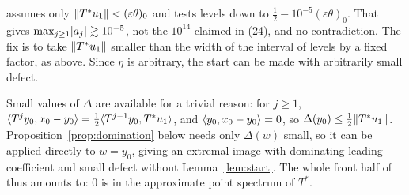 \begin{remark}
\paper{} assumes only $\lVert T^*u_1\rVert<(\varepsilon\theta)_0$ and tests levels down to
$\frac12-10^{-5}(\varepsilon\theta)_0$. That gives $\max_{j\ge1}\lvert a_j\rvert\gtrsim10^{-5}$, not the
$10^{14}$ claimed in \paper{} (24), and no contradiction. The fix is to take $\lVert T^*u_1\rVert$
smaller than the width of the interval of levels by a fixed factor, as above. Since
$\eta$ is arbitrary, the start can be made with arbitrarily small defect.
\end{remark}

\begin{remark}\label{rem:trivialstart}
Small values of $\Delta$ are available for a trivial reason: for $j\ge1$,
$\langle T^jy_0,x_0-y_0\rangle=\frac12\langle T^{j-1}y_0,T^*u_1\rangle$, and $\langle y_0,x_0-y_0\rangle=0$, so
$\Delta(y_0)\le\frac12\lVert T^*u_1\rVert$. Proposition~\ref{prop:domination} below needs only
$\Delta(w)$ small, so it can be applied directly to $w=y_0$, giving an extremal image with
dominating leading coefficient and small defect without Lemma~\ref{lem:start}. The whole
front half of \paper{} thus amounts to: $0$ is in the approximate point spectrum of $T^*$.
\end{remark}
